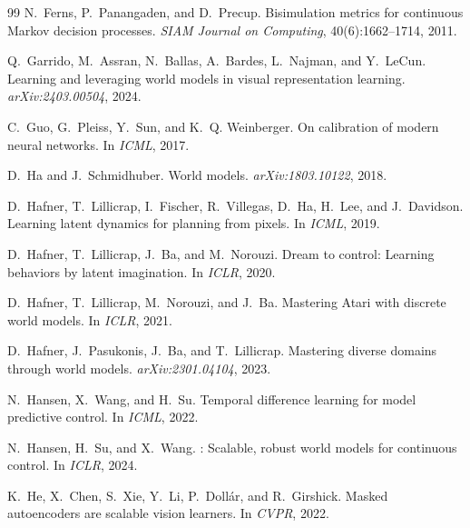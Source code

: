 \documentclass[10pt,twocolumn]{article}
\theoremstyle{tightstyle}
\begin{document}
\begin{thebibliography}{99}
N.~Ferns, P.~Panangaden, and D.~Precup.
\newblock Bisimulation metrics for continuous Markov decision processes.
\newblock \emph{SIAM Journal on Computing}, 40(6):1662--1714, 2011.

Q.~Garrido, M.~Assran, N.~Ballas, A.~Bardes, L.~Najman, and Y.~LeCun.
\newblock Learning and leveraging world models in visual representation learning.
\newblock \emph{arXiv:2403.00504}, 2024.

C.~Guo, G.~Pleiss, Y.~Sun, and K.~Q. Weinberger.
\newblock On calibration of modern neural networks.
\newblock In \emph{ICML}, 2017.

D.~Ha and J.~Schmidhuber.
\newblock World models.
\newblock \emph{arXiv:1803.10122}, 2018.

D.~Hafner, T.~Lillicrap, I.~Fischer, R.~Villegas, D.~Ha, H.~Lee, and
J.~Davidson.
\newblock Learning latent dynamics for planning from pixels.
\newblock In \emph{ICML}, 2019.

D.~Hafner, T.~Lillicrap, J.~Ba, and M.~Norouzi.
\newblock Dream to control: Learning behaviors by latent imagination.
\newblock In \emph{ICLR}, 2020.

D.~Hafner, T.~Lillicrap, M.~Norouzi, and J.~Ba.
\newblock Mastering Atari with discrete world models.
\newblock In \emph{ICLR}, 2021.

D.~Hafner, J.~Pasukonis, J.~Ba, and T.~Lillicrap.
\newblock Mastering diverse domains through world models.
\newblock \emph{arXiv:2301.04104}, 2023.

N.~Hansen, X.~Wang, and H.~Su.
\newblock Temporal difference learning for model predictive control.
\newblock In \emph{ICML}, 2022.

N.~Hansen, H.~Su, and X.~Wang.
: Scalable, robust world models for continuous control.
\newblock In \emph{ICLR}, 2024.

K.~He, X.~Chen, S.~Xie, Y.~Li, P.~Doll{\'a}r, and R.~Girshick.
\newblock Masked autoencoders are scalable vision learners.
\newblock In \emph{CVPR}, 2022.


\end{thebibliography}
\end{document}
